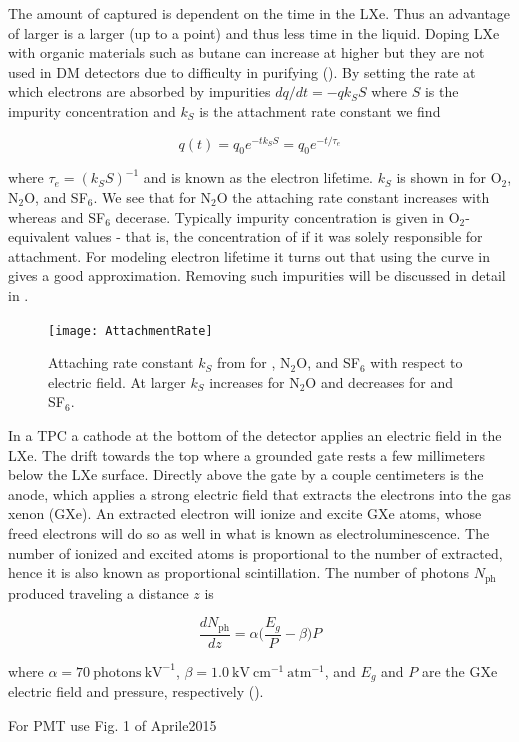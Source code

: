\noindent The amount of \electron captured is dependent on the time in the LXe.  Thus an advantage of larger \efields is a larger
\vd (up to a point) and thus less time in the liquid.  Doping LXe with organic materials such as butane can increase \vd at higher
\efields but they are not used in DM detectors due to difficulty in purifying ().  By setting the rate at which
electrons are absorbed by impurities $dq/dt = -qk_{S}S$ where $S$ is the impurity concentration and $k_{S}$ is the attachment rate
constant we find

\begin{equation}
q(t) = q_{0}e^{-tk_{S}S} = q_{0}e^{-t/\tau_{e}}
\label{eq:lifetime_equation}
\end{equation}

\noindent where $\tau_{e} = (k_{S}S)^{-1}$ and is known as the electron lifetime.  $k_{S}$ is shown in  for
O$_{2}$,
N$_{2}$O, and SF$_{6}$.  We see that for N$_{2}$O the attaching rate constant increases with \efield whereas \otwo and SF$_{6}$
decerase.  Typically impurity concentration is given in O$_{2}$-equivalent values - that is, the concentration of \otwo if it was solely
responsible for \electron attachment.  For modeling electron lifetime it turns out that using the \otwo curve in
 gives a good approximation.  Removing such impurities will be discussed in detail in \secref{}.

\begin{figure}
\texttt{[image: AttachmentRate]}
\caption{Attaching rate constant $k_{S}$ from  for \otwo, N$_{2}$O, and SF$_{6}$ with respect to electric field.  At
larger \efield $k_{S}$ increases for N$_{2}$O and decreases for \otwo and SF$_{6}$.}
\label{fig:attachment_rate}
\end{figure}

In a TPC a cathode at the bottom of the detector applies an electric field in the LXe.  The \electron drift towards the top where a
grounded gate rests a few millimeters below the LXe surface.  Directly above the gate by a couple centimeters is the anode, which
applies a strong electric field that extracts the electrons into the gas xenon (GXe).  An extracted electron will ionize and excite
GXe atoms, whose freed electrons will do so as well in what is known as electroluminescence.  The number of ionized and excited atoms
is proportional to the number of \electron extracted, hence it is also known as proportional scintillation.  The number of photons
$N_{\mathrm{ph}}$ produced traveling a distance $z$ is

\begin{equation}
\frac{dN_{\mathrm{ph}}}{dz} = \alpha \Big( \frac{E_{g}}{P} - \beta \Big) P
\label{eq:electronlum}
\end{equation}

\noindent where $\alpha = 70\ \mathrm{photons\ kV^{-1}}$, $\beta = 1.0\ \mathrm{kV\ cm^{-1}\ atm^{-1}}$, and $E_{g}$ and $P$ are the
GXe electric field and pressure, respectively ().

For PMT use Fig. 1 of Aprile2015